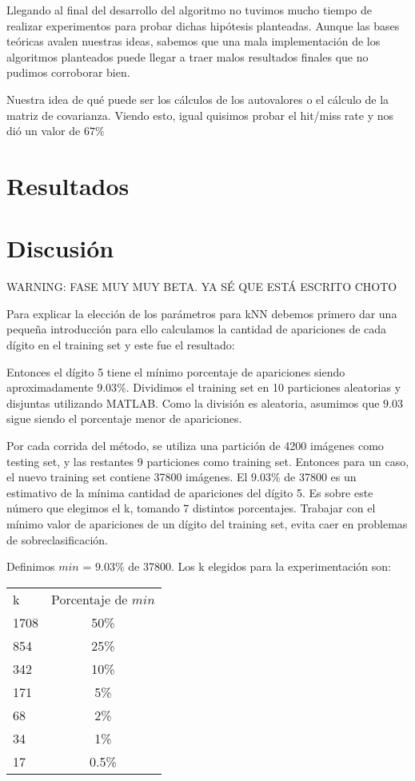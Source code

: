 \documentclass{article}
\begin{document}
  
  Llegando al final del desarrollo del algoritmo no tuvimos mucho tiempo de realizar experimentos para probar dichas hipótesis planteadas. Aunque las bases teóricas avalen nuestras ideas, sabemos que una mala implementación de los algoritmos planteados puede llegar a traer malos resultados finales que no pudimos corroborar bien.
  
  Nuestra idea de qué puede ser los cálculos de los autovalores o el cálculo de la matriz de covarianza. Viendo esto, igual quisimos probar el hit/miss rate y nos dió un valor de $67\%$
 

\section*{Resultados}{}



\section*{Discusión}{}

WARNING: FASE MUY MUY BETA. YA SÉ QUE ESTÁ ESCRITO CHOTO

Para explicar la elección de los parámetros para kNN debemos primero dar una pequeña introducción para ello calculamos la cantidad de apariciones de cada dígito en el training set y este fue el resultado:



Entonces el dígito 5 tiene el mínimo porcentaje de apariciones siendo aproximadamente $9.03\%$.  Dividimos el training set en 10 particiones aleatorias y disjuntas utilizando MATLAB. Como la división es aleatoria, asumimos que $9.03$ sigue siendo el porcentaje menor de apariciones. 

Por cada corrida del método, se utiliza una partición de 4200 imágenes como testing set, y las restantes 9 particiones como training set.  Entonces para un caso, el nuevo training set contiene 37800 imágenes. El $9.03\%$ de 37800 es un estimativo de la mínima cantidad de apariciones del dígito 5. Es sobre este número que elegimos el k, tomando 7 distintos porcentajes. Trabajar con el mínimo valor de apariciones de un dígito del training set, evita caer en problemas de sobreclasificación.



Definimos $min$ = $9.03\%$ de 37800. Los k elegidos para la experimentación son: \newline
\begin{center}
\begin{tabular}{ l | c }
 k & Porcentaje de $min$  \\
1708 & 50\% \\
854 & 25\% \\
342 & 10\% \\
171 & 5\% \\
68 & 2\% \\
34 & 1\% \\
17& 0.5\% \\

\end{tabular}
\end{center}
\end{document}
